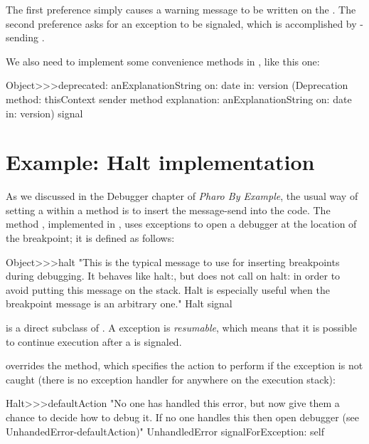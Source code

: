 \documentclass[a4paper,10pt,twoside]{book}
\begin{document}
The first preference simply causes a warning message to be written on the .  The second preference asks for an exception to be signaled, which is accomplished by \super-sending .

We also need to implement some convenience methods in , like this one:
\begin{code}{}
Object>>>deprecated: anExplanationString on: date in: version
	(Deprecation
		method: thisContext sender method
		explanation: anExplanationString
		on: date
		in: version) signal
\end{code}

\section{Example: Halt implementation}

As we discussed in the Debugger chapter of \emph{Pharo By Example}, 
the usual way of setting a  within a \st{} method is to insert the message-send  into the code. The method , implemented in , uses exceptions to open a debugger at the location of the breakpoint; it is defined as follows:

\begin{code}{}
Object>>>halt
	"This is the typical message to use for inserting breakpoints during 
	debugging. It behaves like halt:, but does not call on halt: in order to 
	avoid putting this message on the stack. Halt is especially useful when 
	the breakpoint message is an arbitrary one."
	Halt signal
\end{code}

 is a direct subclass of . A  exception is \emph{resumable}, which means that it is possible to continue execution after a  is signaled. 

 overrides the  method, which specifies the action to perform if the exception is not caught (\ie there is no exception handler for  anywhere on the execution stack):

\begin{code}{}
Halt>>>defaultAction
	"No one has handled this error, but now give them a chance to decide
	how to debug it.  If no one handles this then open debugger
	(see UnhandedError-defaultAction)"
	UnhandledError signalForException: self
\end{code}
\end{document}
